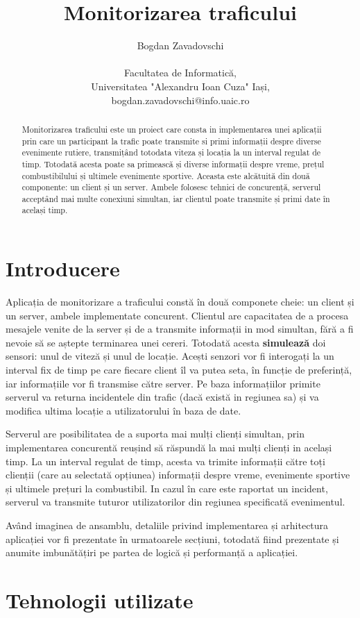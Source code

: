 \documentclass{article}
\author{Bogdan Zavadovschi \protect\\ 
\protect\\
\small Facultatea de Informatică, 
\protect\\
\small Universitatea "Alexandru Ioan Cuza" Iași,
\protect\\ 
\small bogdan.zavadovschi@info.uaic.ro}
\title{
    \textbf{Monitorizarea traficului} 
}
\date{}
\begin{document}
\maketitle
\begin{abstract}
    Monitorizarea traficului este un proiect care consta in implementarea unei aplicații prin care un participant la trafic poate transmite si primi informații despre diverse evenimente rutiere, transmițând totodata viteza și locația la un interval regulat de timp. Totodată acesta poate sa primească și diverse informații despre vreme, prețul combustibilului și ultimele evenimente sportive. Aceasta este alcătuită din două componente: un client și un server. Ambele folosesc tehnici de concurență, serverul acceptând mai multe conexiuni simultan, iar clientul poate transmite și primi date în același timp.
\end{abstract}
\section{Introducere}
Aplicația de monitorizare a traficului constă în două componete cheie: un client și un server, ambele implementate concurent. Clientul are capacitatea de a procesa mesajele venite de la server și de a transmite informații in mod simultan, fără a fi nevoie să se aștepte terminarea unei cereri. Totodată acesta \textbf{simulează} doi sensori: unul de viteză și unul de locație. Acești senzori vor fi interogați la un interval fix de timp pe care fiecare client îl va putea seta, în funcție de preferință, iar informațiile vor fi transmise către server. Pe baza informațiilor primite serverul va returna incidentele din trafic (dacă există in regiunea sa) și va modifica ultima locație a utilizatorului în baza de date.

Serverul are posibilitatea de a suporta mai mulți clienți simultan, prin implementarea concurentă reușind să răspundă la mai mulți clienți in același timp. La un interval regulat de timp, acesta va trimite informații către toți clienții (care au selectată opțiunea) informații despre vreme, evenimente sportive și ultimele prețuri la combustibil. In cazul în care este raportat un incident, serverul va transmite tuturor utilizatorilor din regiunea specificată evenimentul.   

Având imaginea de ansamblu, detaliile privind implementarea și arhitectura aplicației vor fi prezentate în urmatoarele secțiuni, totodată fiind prezentate și anumite imbunătățiri pe partea de logică și performanță a aplicației. 
\section{Tehnologii utilizate}
\end{document}
